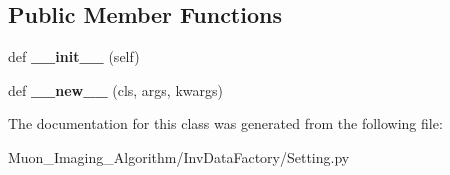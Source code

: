 \subsection*{Public Member Functions}
\begin{DoxyCompactItemize}
\item 
\mbox{\label{classMIS_1_1Muon__Imaging__Algorithm_1_1InvDataFactory_1_1Setting_1_1Setting_1_1__Tools__setting_a4e223f0c9abfcc4aa1135df865712a6c}} 
def {\bfseries \+\_\+\+\_\+init\+\_\+\+\_\+} (self)
\item 
\mbox{\label{classMIS_1_1Muon__Imaging__Algorithm_1_1InvDataFactory_1_1Setting_1_1Setting_1_1__Tools__setting_a10bb55a80278b54258cd003c5b95efde}} 
def {\bfseries \+\_\+\+\_\+new\+\_\+\+\_\+} (cls, args, kwargs)
\end{DoxyCompactItemize}


The documentation for this class was generated from the following file\+:\begin{DoxyCompactItemize}
\item 
Muon\+\_\+\+Imaging\+\_\+\+Algorithm/\+Inv\+Data\+Factory/Setting.\+py\end{DoxyCompactItemize}
